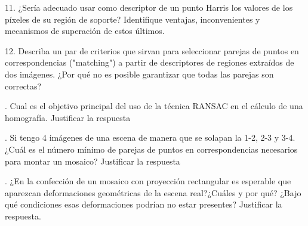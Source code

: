\documentclass[12pt,a4paper]{article}
\begin{document}
	11. ¿Sería adecuado usar como descriptor de un punto Harris los valores de los píxeles de su región de soporte? Identifique ventajas, inconvenientes y mecanismos de superación de estos últimos.
	
	\newpage
	
	12. Describa un par de criterios que sirvan para seleccionar parejas de puntos en correspondencias ("matching") a partir de descriptores de regiones extraídos de dos imágenes. ¿Por qué no es posible garantizar que todas las parejas son correctas?
	
	. Cual es el objetivo principal del uso de la técnica RANSAC en el cálculo de una homografía. Justificar la respuesta
	
	. Si tengo 4 imágenes de una escena de manera que se solapan la 1-2, 2-3 y 3-4. ¿Cuál es el número mínimo de parejas de puntos en correspondencias necesarios para montar un mosaico? Justificar la respuesta
	
	. ¿En la confección de un mosaico con proyección rectangular es esperable que aparezcan deformaciones geométricas de la escena real?¿Cuáles y por qué? ¿Bajo qué condiciones esas deformaciones podrían no estar presentes? Justificar la respuesta.
\end{document}
